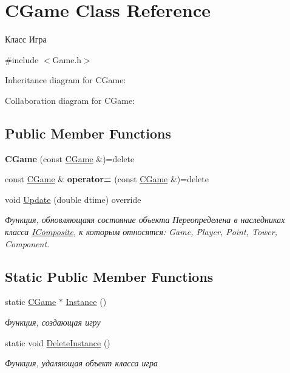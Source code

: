 \hypertarget{classCGame}{}\section{C\+Game Class Reference}
\label{classCGame}


Класс Игра  




{\ttfamily \#include $<$Game.\+h$>$}



Inheritance diagram for C\+Game\+:


Collaboration diagram for C\+Game\+:
\subsection*{Public Member Functions}
\begin{DoxyCompactItemize}
\item 
{\bfseries C\+Game} (const \hyperlink{classCGame}{C\+Game} \&)=delete\hypertarget{classCGame_af7631392fe28c5e2572af426b48f44b8}{}\label{classCGame_af7631392fe28c5e2572af426b48f44b8}

\item 
const \hyperlink{classCGame}{C\+Game} \& {\bfseries operator=} (const \hyperlink{classCGame}{C\+Game} \&)=delete\hypertarget{classCGame_a5814a055a7c146adecd9c196a26bba5b}{}\label{classCGame_a5814a055a7c146adecd9c196a26bba5b}

\item 
void \hyperlink{classCGame_a7fd9071f64f9f8593ba7ef97e52747b0}{Update} (double dtime) override
\begin{DoxyCompactList}\small\item\em Функция, обновляющаяя состояние объекта Переопределена в наследниках класса \hyperlink{classIComposite}{I\+Composite}, к которым относятся\+: Game, Player, Point, Tower, Component. \end{DoxyCompactList}\end{DoxyCompactItemize}
\subsection*{Static Public Member Functions}
\begin{DoxyCompactItemize}
\item 
static \hyperlink{classCGame}{C\+Game} $\ast$ \hyperlink{classCGame_a324bb18369f06a07c27104493498456c}{Instance} ()
\begin{DoxyCompactList}\small\item\em Функция, создающая игру \end{DoxyCompactList}\item 
static void \hyperlink{classCGame_a025721a43ac0307fc207ada0bd9bb695}{Delete\+Instance} ()
\begin{DoxyCompactList}\small\item\em Функция, удаляющая объект класса игра \end{DoxyCompactList}\end{DoxyCompactItemize}
